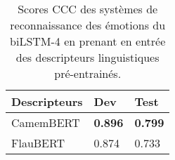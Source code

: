 \begin{table}[h]
  \centering
  \begin{tabular}{|l|l|l|}
  \hline
  Descripteurs   &Dev   &Test  \\
  \hline
  CamemBERT      &\textbf{0.896} &\textbf{0.799} \\
  FlauBERT       &0.874 &0.733 \\
  \hline
\end{tabular}
\caption{Scores CCC des systèmes de reconnaissance des émotions du biLSTM-4 en prenant en entrée des descripteurs linguistiques pré-entrainés.}
\label{tab:res_camembert}
\end{table}
